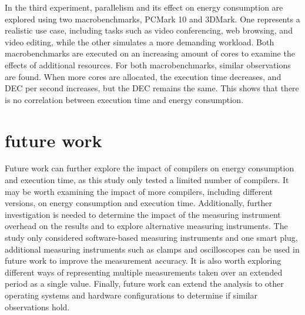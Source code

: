In the third experiment, parallelism and its effect on energy consumption are explored using two macrobenchmarks, PCMark 10 and 3DMark. One represents a realistic use case, including tasks such as video conferencing, web browsing, and video editing, while the other simulates a more demanding workload. Both macrobenchmarks are executed on an increasing amount of cores to examine the effects of additional resources. For both macrobenchmarks, similar observations are found. When more cores are allocated, the execution time decreases, and DEC per second increases, but the DEC remains the same. This shows that there is no correlation between execution time and energy consumption.  


\section{future work}
Future work can further explore the impact of compilers on energy consumption and execution time, as this study only tested a limited number of compilers. It may be worth examining the impact of more compilers, including different versions, on energy consumption and execution time. Additionally, further investigation is needed to determine the impact of the measuring instrument overhead on the results and to explore alternative measuring instruments. The study only considered software-based measuring instruments and one smart plug, additional measuring instruments such as clamps and oscilloscopes can be used in future work to improve the measurement accuracy. It is also worth exploring different ways of representing multiple measurements taken over an extended period as a single value. Finally, future work can extend the analysis to other operating systems and hardware configurations to determine if similar observations hold.